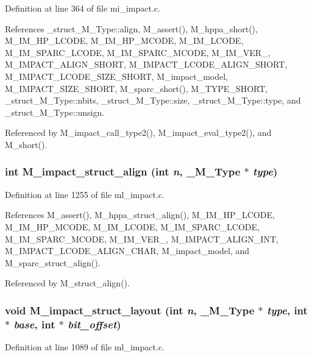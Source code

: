 Definition at line 364 of file mi\_\-impact.c.

References \_\-struct\_\-M\_\-Type::align, M\_\-assert(), M\_\-hppa\_\-short(), M\_\-IM\_\-HP\_\-LCODE, M\_\-IM\_\-HP\_\-MCODE, M\_\-IM\_\-LCODE, M\_\-IM\_\-SPARC\_\-LCODE, M\_\-IM\_\-SPARC\_\-MCODE, M\_\-IM\_\-VER\_, M\_\-IMPACT\_\-ALIGN\_\-SHORT, M\_\-IMPACT\_\-LCODE\_\-ALIGN\_\-SHORT, M\_\-IMPACT\_\-LCODE\_\-SIZE\_\-SHORT, M\_\-impact\_\-model, M\_\-IMPACT\_\-SIZE\_\-SHORT, M\_\-sparc\_\-short(), M\_\-TYPE\_\-SHORT, \_\-struct\_\-M\_\-Type::nbits, \_\-struct\_\-M\_\-Type::size, \_\-struct\_\-M\_\-Type::type, and \_\-struct\_\-M\_\-Type::unsign.

Referenced by M\_\-impact\_\-call\_\-type2(), M\_\-impact\_\-eval\_\-type2(), and M\_\-short().
\subsubsection{\setlength{\rightskip}{0pt plus 5cm}int M\_\-impact\_\-struct\_\-align (int {\em n}, \bf{\_\-M\_\-Type} $\ast$ {\em type})}\label{m__impact_8h_d21888c9bce1dd53494b008eed89ca60}




Definition at line 1255 of file ml\_\-impact.c.

References M\_\-assert(), M\_\-hppa\_\-struct\_\-align(), M\_\-IM\_\-HP\_\-LCODE, M\_\-IM\_\-HP\_\-MCODE, M\_\-IM\_\-LCODE, M\_\-IM\_\-SPARC\_\-LCODE, M\_\-IM\_\-SPARC\_\-MCODE, M\_\-IM\_\-VER\_, M\_\-IMPACT\_\-ALIGN\_\-INT, M\_\-IMPACT\_\-LCODE\_\-ALIGN\_\-CHAR, M\_\-impact\_\-model, and M\_\-sparc\_\-struct\_\-align().

Referenced by M\_\-struct\_\-align().
\subsubsection{\setlength{\rightskip}{0pt plus 5cm}void M\_\-impact\_\-struct\_\-layout (int {\em n}, \bf{\_\-M\_\-Type} $\ast$ {\em type}, int $\ast$ {\em base}, int $\ast$ {\em bit\_\-offset})}\label{m__impact_8h_9cfb90318cc28da689ae4bf6a912352a}




Definition at line 1089 of file ml\_\-impact.c.

